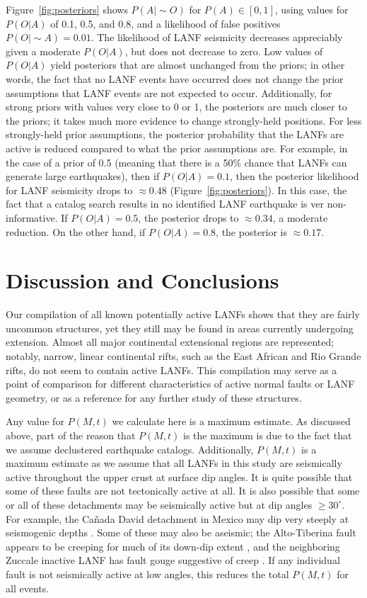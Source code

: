 \documentclass[draft,grl]{AGUTeX}
\begin{document}
\begin{article}
Figure~\ref{fig:posteriors} shows $P(A|\sim O)$ for $P(A) \in [0,1]$, using
values for $P(O|A)$ of 0.1, 0.5, and 0.8, and a likelihood of false positives
$P(O|\sim A)= 0.01$. The likelihood of LANF seismicity decreases appreciably
given a moderate $P(O|A)$, but does not decrease to zero. Low values of
$P(O|A)$ yield posteriors that are almost unchanged from the priors; in other
words, the fact that no LANF events have occurred does not change the prior
assumptions that LANF events are not expected to occur.  Additionally, for
strong priors with values very close to 0 or 1, the posteriors are much closer
to the priors; it takes much more evidence to change strongly-held positions.
For less strongly-held prior assumptions, the posterior probability that the
LANFs are active is reduced compared to what the prior assumptions are. For
example, in the case of a prior of 0.5 (meaning that there is a 50\% chance
that LANFs can generate large earthquakes), then if $P(O|A)=0.1$, then the
posterior likelihood for LANF seismicity drops to $\approx 0.48$
(Figure~\ref{fig:posteriors}). In this case, the fact that a catalog search
results in no identified LANF earthquake is ver non-informative. If
$P(O|A)=0.5$, the posterior drops to $\approx 0.34$, a moderate reduction.  On
the other hand, if $P(O|A)=0.8$, the posterior is $\approx 0.17$.

\section{Discussion and Conclusions}

Our compilation of all known potentially active LANFs shows that they are
fairly uncommon structures, yet they still may be found in areas currently
undergoing extension. Almost all major continental extensional regions are
represented; notably, narrow, linear continental rifts, such as the East
African and Rio Grande rifts, do not seem to contain active LANFs.  This
compilation may serve as a point of comparison for different characteristics of
active normal faults or LANF geometry, or as a reference for any further
study of these structures.

Any value for $P(M,t)$ we calculate here is a maximum estimate. As discussed
above, part of the reason that $P(M,t)$ is the maximum is due to the fact that we
assume declustered earthquake catalogs. Additionally, $P(M,t)$ is a maximum
estimate as we assume that all LANFs in this study are seismically active
throughout the upper crust at surface dip angles.  It is quite possible that
some of these faults are not tectonically active at all. It is also possible
that some or all of these detachments may be seismically active but at dip
angles $\ge30^\circ$.  For example, the Ca\~nada David detachment in Mexico may
dip very steeply at seismogenic depths \citep{fletcherspelz2009}.  Some of
these may also be aseismic; the Alto-Tiberina fault appears to be creeping for
much of its down-dip extent \citep{hreinsdottir2009altotib}, and the
neighboring Zuccale inactive LANF has fault gouge suggestive of creep
\citep{collettiniholdsworth2004}. If any individual fault is not seismically
active at low angles, this reduces the total $P(M, t)$ for all events.


\end{article}
\end{document}
